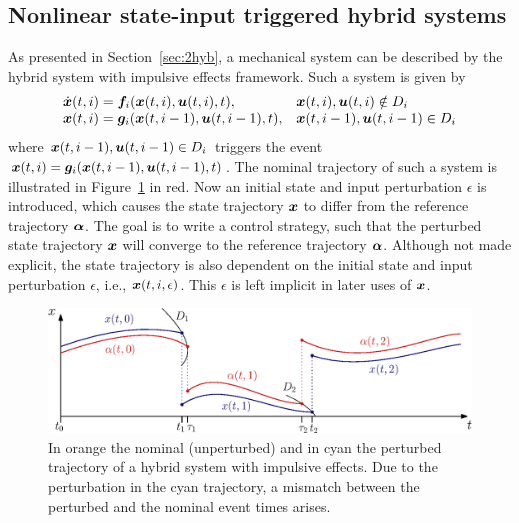 \documentclass[../DC2017114Bouma.tex]{subfiles}
\begin{document}
\subsection{Nonlinear state-input triggered hybrid systems}
As presented in Section~\ref{sec:2hyb}, a mechanical system can be described by the hybrid system with impulsive effects framework. Such a system is given by
\begin{equation}
\begin{array}{ll}
\dot{{\boldsymbol{x}}}(t,i) ={\boldsymbol{f}}_i({\boldsymbol{x}}(t,i),{\boldsymbol{u}}(t,i),t),& {\boldsymbol{x}}(t,i),{\boldsymbol{u}}(t,i)\notin D_i\\
{\boldsymbol{x}}(t,i) = {\boldsymbol{g}}_i({\boldsymbol{x}}(t,i-1),{\boldsymbol{u}}(t,i-1),t),& {\boldsymbol{x}}(t,i-1),{\boldsymbol{u}}(t,i-1)\in D_i
\end{array}\label{eq:3hybimp}
\end{equation}
where ${\boldsymbol{x}}(t,i-1),{\boldsymbol{u}}(t,i-1)\in D_i$ triggers the event ${\boldsymbol{x}}(t,i) = {\boldsymbol{g}}_i({\boldsymbol{x}}(t,i-1),{\boldsymbol{u}}(t,i-1),t)$. The nominal trajectory of such a system is illustrated in Figure~\ref{fig:3perturbedtraj} in red. Now an initial state and input perturbation $\epsilon$ is introduced, which causes the state trajectory ${\boldsymbol{x}}$ to differ from the reference trajectory $\boldsymbol{\alpha}$. The goal is to write a control strategy, such that the perturbed state trajectory ${\boldsymbol{x}}$ will converge to the reference trajectory $\boldsymbol{\alpha}$. Although not made explicit, the state trajectory is also dependent on the initial state and input perturbation $\epsilon$, i.e., ${\boldsymbol{x}}(t,i,\epsilon)$. This $\epsilon$ is left implicit in later uses of ${\boldsymbol{x}}$.
\begin{figure}[h]
\centering
\includegraphics[width=.8\textwidth]{perturbedtraj.eps}\caption{In orange the nominal (unperturbed) and in cyan the perturbed trajectory of a hybrid system with impulsive effects. Due to the perturbation in the cyan trajectory, a mismatch between the perturbed and the nominal event times arises.} \label{fig:3perturbedtraj}
\end{figure}
\end{document}
